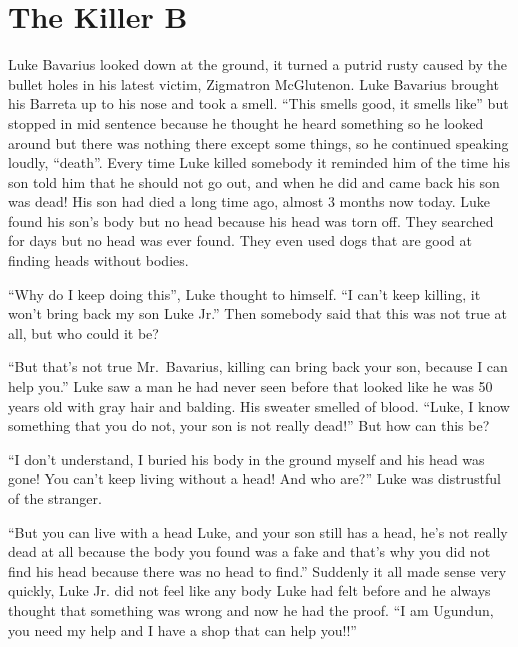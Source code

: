 \chapter{The Killer B}





Luke Bavarius looked down at the ground, it turned a putrid rusty
caused by the bullet holes in his latest victim, Zigmatron
McGlutenon. Luke Bavarius brought his Barreta up to his nose and
took a smell. ``This smells good, it smells like'' but
stopped in mid sentence because he thought he heard something so he
looked around but there was nothing there except some things, so he
continued speaking loudly, ``death''. Every time Luke
killed somebody it reminded him of the time his son told him that
he should not go out, and when he did and came back his son was
dead! His son had died a long time ago, almost 3 months now today.
Luke found his son's body but no head because his head was torn
off. They searched for days but no head was ever found. They even
used dogs that are good at finding heads without bodies.



``Why do I keep doing this'', Luke thought to himself.
``I can't keep killing, it won't bring back my son Luke
Jr.'' Then somebody said that this was not true at all, but
who could it be?



``But that's not true Mr.\ Bavarius, killing can bring back
your son, because I can help you.'' Luke saw a man he had
never seen before that looked like he was 50 years old with gray
hair and balding. His sweater smelled of blood. ``Luke, I know
something that you do not, your son is not really dead!'' But
how can this be?



``I don't understand, I buried his body in the ground myself
and his head was gone! You can't keep living without a head! And
who are?'' Luke was distrustful of the stranger.



``But you can live with a head Luke, and your son still has a
head, he's not really dead at all because the body you found was a
fake and that's why you did not find his head because there was no
head to find.'' Suddenly it all made sense very quickly, Luke
Jr. did not feel like any body Luke had felt before and he always
thought that something was wrong and now he had the proof. ``I
am Ugundun, you need my help and I have a shop that can help
you!!''



